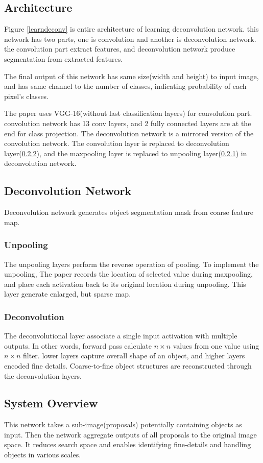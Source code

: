\documentclass[extendedabs]{bmvc2k}
\begin{document}
\subsection{Architecture}
Figure \ref{learndeconv} is entire architecture of learning deconvolution network. this network has two parts, one is convolution and another is deconvolution network. the convolution part extract features, and deconvolution network produce segmentation from extracted features.

The final output of this network has same size(width and height) to input image, and has same channel to the number of classes, indicating probability of each pixel's classes.

The paper uses VGG-16\cite{vgg}(without last classification layers) for convolution part. convolution network has 13 conv layers, and 2 fully connected layers are at the end for class projection. The deconvolution network is a mirrored version of the convolution network. The convolution layer is replaced to deconvolution layer(\ref{deconvolution}), and the maxpooling layer is replaced to unpooling layer(\ref{unpooling}) in deconvolution network.
\subsection{Deconvolution Network}
Deconvolution network generates object segmentation mask from coarse feature map.
\subsubsection{Unpooling} \label{unpooling}
The unpooling layers perform the reverse operation of pooling. To implement the unpooling, The paper\cite{learndeconv} records the location of selected value during maxpooling, and place each activation back to its original location during unpooling. This layer generate enlarged, but sparse map.
\subsubsection{Deconvolution} \label{deconvolution}
The deconvolutional layer associate a single input activation with multiple outputs. In other words, forward pass calculate $n\times n$ values from one value using $n\times n$ filter. lower layers capture overall shape of an object, and higher layers encoded fine details. Coarse-to-fine object structures are reconstructed through the deconvolution layers.
\subsection{System Overview}
This network takes a sub-image(proposals) potentially containing objects as input. Then the network aggregate outputs of all proposals to the original image space. It reduces search space and enables identifying fine-details and handling objects in various scales.
\end{document}
